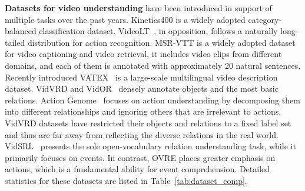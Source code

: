 \documentclass[letterpaper]{article}
\begin{document}
\noindent \textbf{Datasets for video understanding} have been introduced in support of multiple tasks over the past years.
Kinetics400 \cite{Kay2017TheKH} is a widely adopted category-balanced classification dataset. VideoLT~\cite{zhang2021videolt}, in opposition, follows a naturally long-tailed distribution for action recognition.
MSR-VTT \cite{7780940} is a widely adopted dataset for video captioning and video retrieval, it includes video clips from different domains, and each of them is annotated with approximately 20 natural sentences. Recently introduced VATEX~\cite{wang2019vatex} is a large-scale multilingual video description dataset.
VidVRD \cite{Shang2017VideoVR} and VidOR~\cite{shang2019annotating} densely annotate objects and the most basic relations.
Action Genome~\cite{genome} focuses on action understanding by decomposing them into different relationships and ignoring others that are irrelevant to actions. 
VidVRD datasets have restricted their objects and relations to a fixed label set and thus are far away from reflecting the diverse relations in the real world.
VidSRL~\cite{sadhu2021visual} presents the sole open-vocabulary relation understanding task, while it primarily focuses on events. In contrast, OVRE places greater emphasis on actions, which is a fundamental ability for event comprehension.
Detailed statistics for these datasets are listed in Table~\ref{tab:dataset_comp}.


% 
% 
\end{document}
